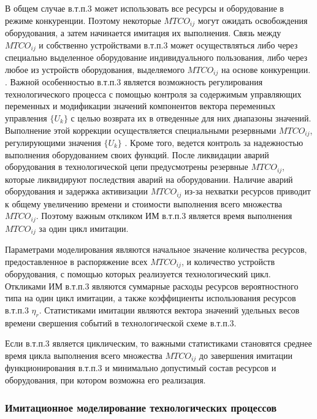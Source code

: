 В общем случае в.т.п.3 может использовать все ресурсы и оборудование в режиме конкуренции. Поэтому некоторые $MTCO_{ij}$ могут ожидать освобождения оборудования, а затем начинается имитация их выполнения. Связь между $MTCO_{ij}$ и собственно устройствами в.т.п.3 может осуществляться либо через специально выделенное оборудование индивидуального пользования, либо через любое из устройств оборудования, выделяемого $MTCO_{ij}$ на основе конкуренции. . Важной особенностью в.т.п.3 является возможность регулирования технологического процесса с помощью контроля за содержимым управляющих переменных и модификации значений компонентов вектора переменных управления $\{U_k\}$ с целью возврата их в отведенные для них диапазоны значений. Выполнение этой коррекции осуществляется специальными резервными $MTCO_{ij}$, регулирующими значения $\{U_k\}$ . Кроме того, ведется контроль за надежностью выполнения оборудованием своих функций. После ликвидации аварий оборудования в технологической цепи предусмотрены резервные $MTCO_{ij}$, которые ликвидируют последствия аварий на оборудовании. Наличие аварий оборудования и задержка активизации $MTCO_{ij}$ из-за нехватки ресурсов приводит к общему увеличению времени и стоимости выполнения всего множества {$MTCO_{ij}$}. Поэтому важным откликом ИМ в.т.п.3 является время выполнения {$MTCO_{ij}$} за один цикл имитации.

Параметрами моделирования являются начальное значение количества ресурсов, предоставленное в распоряжение всех $MTCO_{ij}$, и количество устройств оборудования, с помощью которых реализуется технологический цикл. Откликами ИМ в.т.п.3 являются суммарные расходы ресурсов вероятностного типа на один цикл имитации, а также коэффициенты использования ресурсов в.т.п.3 {$\eta_{r}$}. Статистиками имитации являются вектора значений удельных весов времени свершения событий в технологической схеме в.т.п.3.

Если в.т.п.3 является циклическим, то важными статистиками становятся среднее время цикла выполнения всего множества {$MTCO_{ij}$} до завершения имитации функционирования в.т.п.3 и минимально допустимый состав ресурсов и оборудования, при котором возможна его реализация.


%

\subsubsection{Имитационное моделирование технологических процессов}
\label{sec_chapter_enterprise_smodeling}


